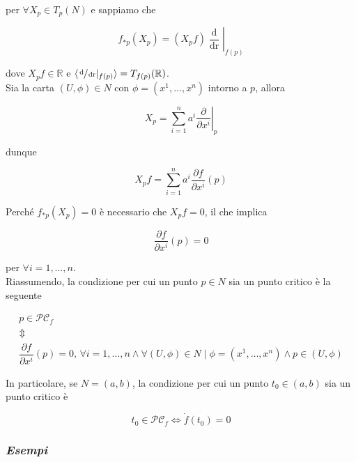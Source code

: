 per $ \forall X_{p} \in T_{p}(N) $ e sappiamo che

\begin{equation}
	f_{*p}(X_{p}) = (X_{p} f) \left. \dfrac{\operatorname{d}}{\operatorname{dr}} \right|_{f(p)}
\end{equation}

dove $ X_{p} f \in \mathbb{R} $ e $ \langle \sfrac{\operatorname{d}}{\operatorname{dr}} |_{f(p)} \rangle = T_{f(p)}(\mathbb{R}) $.\\
Sia la carta $ (U,\phi) \in N $ con $ \phi = (x^{1},\dots,x^{n}) $ intorno a $ p $, allora

\begin{equation}
	X_{p} = \sum_{i=1}^{n} a^{i} \left. \dfrac{\partial}{\partial x^{i}} \right|_{p}
\end{equation}

dunque

\begin{equation}
	X_{p} f = \sum_{i=1}^{n} a^{i} \dfrac{\partial f}{\partial x^{i}} (p)
\end{equation}

Perché $ f_{*p}(X_{p}) = 0 $ è necessario che $ X_{p} f = 0 $, il che implica

\begin{equation}
	\dfrac{\partial f}{\partial x^{i}} (p) = 0
\end{equation}

per $ \forall i=1,\dots,n $.\\
Riassumendo, la condizione per cui un punto $ p \in N $ sia un punto critico è la seguente

\begin{gather}
	p \in \mathcal{PC}_{f}\nonumber\\
	\Updownarrow\\
	\dfrac{\partial f}{\partial x^{i}} (p) = 0, \, \forall i=1,\dots,n \wedge \forall (U,\phi) \in N \mid \phi = (x^{1},\dots,x^{n}) \wedge p \in (U,\phi)\nonumber
\end{gather}

In particolare, se $ N = (a,b) $, la condizione per cui un punto $ t_{0} \in (a,b) $ sia un punto critico è

\begin{equation}
	t_{0} \in \mathcal{PC}_{f} \iff \dot{f}(t_{0}) = 0
\end{equation}

\subsubsection{\textit{Esempi}}

